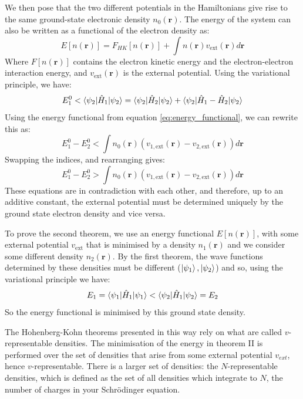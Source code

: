 \documentclass[12pt]{article}
\begin{document}
We then pose that the two different potentials in the Hamiltonians give rise to the same ground-state electronic density $n_0(\mathbf r)$.
The energy of the system can also be written as a functional of the electron density as:
\begin{equation}\label{eq:energy_functional}
E[n(\mathbf r)] = F_{HK}[n(\mathbf r)]+ \int n(\mathbf r)v_{\mathrm{ext}}(\mathbf r)d\mathbf r
\end{equation}
Where $F[n(\mathbf r)]$ contains the electron kinetic energy and the electron-electron interaction energy, and $v_{\mathrm{ext}}(\mathbf r)$ is the external potential.
Using the variational principle, we have:
\begin{equation} 
	E^0_1 < \braket{\psi_2 | \hat H_1 | \psi_2} = \braket{\psi_2 | \hat H_2 | \psi_2} + \braket{\psi_2 |\hat H_1 - \hat H_2 |\psi_2}
\end{equation}
Using the energy functional from equation \ref{eq:energy_functional}, we can rewrite this as:
\begin{equation}\label{eq:contra_1}
E^0_1 - E^0_2 < \int n_0(\mathbf r)(v_{1,\mathrm{ext}}(\mathbf r)-v_{2,\mathrm{ext}}(\mathbf r)) d\mathbf r
\end{equation}
Swapping the indices, and rearranging gives:
\begin{equation}
E^0_1 - E^0_2 > \int n_0(\mathbf r)(v_{1,\mathrm{ext}}(\mathbf r)-v_{2,\mathrm{ext}}(\mathbf r)) d\mathbf r
\end{equation}
These equations are in contradiction with each other, and therefore, up to an additive constant, the external potential must be determined uniquely by the ground state electron density and vice versa.

To prove the second theorem, we use an energy functional $E[n(\mathbf r)]$, with some external potential $v_{\mathrm{ext}}$ that is minimised by a density $n_1(\mathbf r)$ and we consider some different density $n_2(\mathbf r)$. 
By the first theorem, the wave functions determined by these densities must be different ($\ket{\psi_1}, \ket{\psi_2}$) and so, using the variational principle we have:
\begin{equation}\label{eq:hk_2}
E_1 = \braket{\psi_1 | \hat H _1 | \psi_1} < \braket{\psi_2 | \hat H _1 | \psi_2} = E_2
\end{equation}
So the energy functional is minimised by this ground state density.

The Hohenberg-Kohn theorems presented in this way rely on what are called $v$-representable densities. The minimisation of the energy in theorem II is performed over the set of densities that arise from some external potential $v_{ext}$, hence $v$-representable. There is a larger set of densities: the $N$-representable densities, which is defined as the set of all densities which integrate to $N$, the number of charges in your Schrödinger equation.
\end{document}
